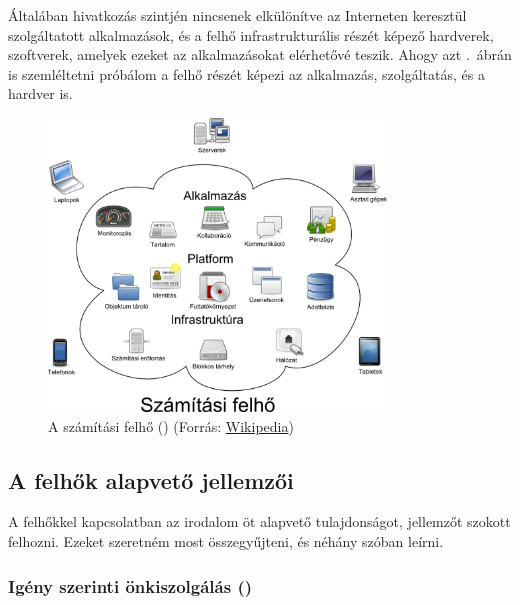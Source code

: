 Általában hivatkozás szintjén nincsenek elkülönítve az Interneten keresztül szolgáltatott alkalmazások, és a felhő infrastrukturális részét képező hardverek, szoftverek, amelyek ezeket az alkalmazásokat elérhetővé teszik. Ahogy azt .~ábrán is szemléltetni próbálom a felhő részét képezi az alkalmazás, szolgáltatás, és a hardver is.

\begin{figure}[h!]
\centering
\includegraphics[width=0.80\textwidth]{figures/Cloud_computing_hu.png}
\caption{A számítási felhő () (Forrás: \href{https://en.wikipedia.org/wiki/File:Cloud\_computing.svg}{Wikipedia})} \label{fig:cloud_computing_hu}
\end{figure}

\subsection{A felhők alapvető jellemzői}
A felhőkkel kapcsolatban az irodalom\cite{nistsp800-145} öt alapvető tulajdonságot, jellemzőt szokott felhozni. Ezeket szeretném most összegyűjteni, és néhány szóban leírni.
 
\subsubsection{Igény szerinti önkiszolgálás ()}

